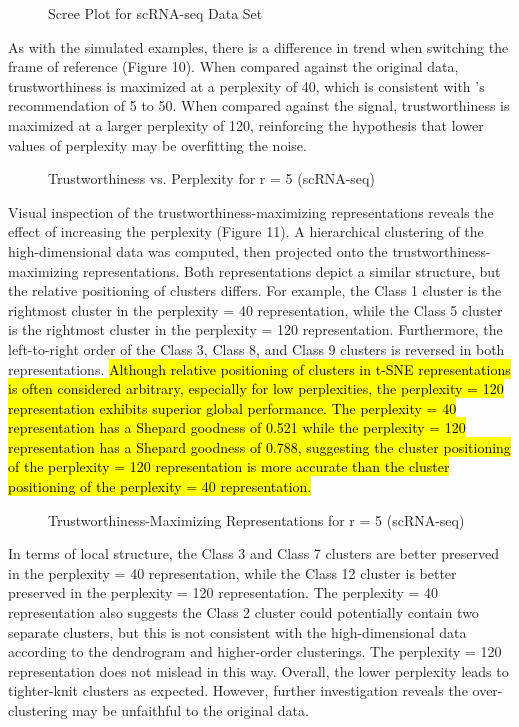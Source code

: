 \documentclass{article}
\begin{document}
\renewcommand{\thefigure}{9}
\begin{figure}[H]
\centering
\caption{Scree Plot for scRNA-seq Data Set}
\end{figure}

As with the simulated examples, there is a difference in trend when switching the frame of reference (Figure 10). When compared against the original data, trustworthiness is maximized at a perplexity of 40, which is consistent with \cite{t-SNE}'s recommendation of 5 to 50. When compared against the signal, trustworthiness is maximized at a larger perplexity of 120, reinforcing the hypothesis that lower values of perplexity may be overfitting the noise.

\renewcommand{\thefigure}{10}
\begin{figure}[H]
\centering
\caption{Trustworthiness vs. Perplexity for r = 5 (scRNA-seq)}
\end{figure}

Visual inspection of the trustworthiness-maximizing representations reveals the effect of increasing the perplexity (Figure 11). A hierarchical clustering of the high-dimensional data was computed, then projected onto the trustworthiness-maximizing representations. Both representations depict a similar structure, but the relative positioning of clusters differs. For example, the Class 1 cluster is the rightmost cluster in the perplexity = 40 representation, while the Class 5 cluster is the rightmost cluster in the perplexity = 120 representation. Furthermore, the left-to-right order of the Class 3, Class 8, and Class 9 clusters is reversed in both representations. \hl{Although relative positioning of clusters in t-SNE representations is often considered arbitrary, especially for low perplexities, the perplexity = 120 representation exhibits superior global performance. The perplexity = 40 representation has a Shepard goodness of 0.521 while the perplexity = 120 representation has a Shepard goodness of 0.788, suggesting the cluster positioning of the perplexity = 120 representation is more accurate than the cluster positioning of the perplexity = 40 representation.}

\renewcommand{\thefigure}{11}
\begin{figure}[H]
\centering
\caption{Trustworthiness-Maximizing Representations for r = 5 (scRNA-seq)}
\end{figure}

In terms of local structure, the Class 3 and Class 7 clusters are better preserved in the perplexity = 40 representation, while the Class 12 cluster is better preserved in the perplexity = 120 representation. The perplexity = 40 representation also suggests the Class 2 cluster could potentially contain two separate clusters, but this is not consistent with the high-dimensional data according to the dendrogram and higher-order clusterings. The perplexity = 120 representation does not mislead in this way. Overall, the lower perplexity leads to tighter-knit clusters as expected. However, further investigation reveals the over-clustering may be unfaithful to the original data.
\end{document}
